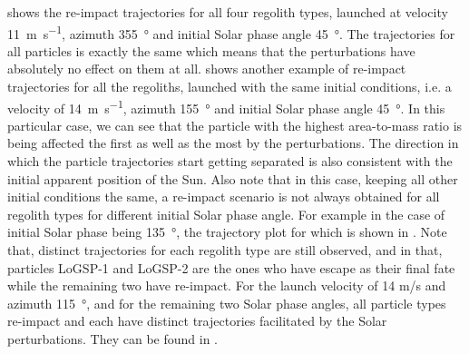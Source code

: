  shows the re-impact trajectories for all four regolith types, launched at velocity \SI{11}{\metre\per\second}, azimuth \SI{355}{\degree} and initial Solar phase angle \SI{45}{\degree}. The trajectories for all particles is exactly the same which means that the perturbations have absolutely no effect on them at all.  shows another example of re-impact trajectories for all the regoliths, launched with the same initial conditions, i.e. a velocity of \SI{14}{\metre\per\second}, azimuth \SI{155}{\degree} and initial Solar phase angle \SI{45}{\degree}. In this particular case, we can see that the particle with the highest area-to-mass ratio is being affected the first as well as the most by the perturbations. The direction in which the particle trajectories start getting separated is also consistent with the initial apparent position of the Sun. Also note that in this case, keeping all other initial conditions the same, a re-impact scenario is not always obtained for all regolith types for different initial Solar phase angle. For example in the case of initial Solar phase being \SI{135}{\degree}, the trajectory plot for which is shown in . Note that, distinct trajectories for each regolith type are still observed, and in that, particles LoGSP-1 and LoGSP-2 are the ones who have escape as their final fate while the remaining two have re-impact. For the launch velocity of 14 m/s and azimuth \SI{115}{\degree}, and for the remaining two Solar phase angles, all particle types re-impact and each have distinct trajectories facilitated by the Solar perturbations. They can be found in .
